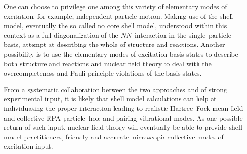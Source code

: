 \documentclass[a4paper,11pt]{book}
\numberwithin{equation}{section}
\numberwithin{figure}{section}
\numberwithin{table}{section}
\begin{document}
One can choose to privilege one among this variety of elementary modes of excitation, for example, independent particle motion. Making use of the shell model, eventually the so called no core shell model, understood within this context as a full diagonalization of the $NN$--interaction in the single--particle basis,  attempt at describing the whole of structure and reactions. Another possibility is to use the elementary modes of excitation basis states to describe both structure and reactions  and nuclear field theory to deal with the overcompleteness and Pauli principle violations of the basis states.

From a systematic collaboration between the two approaches and of strong experimental input, it is likely that shell model calculations can help at individuating the proper interaction leading to realistic Hartree--Fock mean field and collective RPA particle--hole and pairing vibrational modes. As one possible return of such input, nuclear field theory will eventually be able to provide shell model practitioners,  friendly and accurate microscopic collective modes of excitation input.
\end{document}
